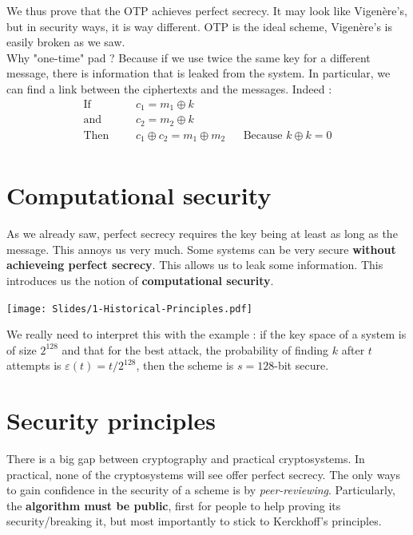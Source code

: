 \documentclass[a4paper, 12pt]{book}
\begin{document}
We thus prove that the OTP achieves perfect secrecy. It may look like Vigenère's, but in security ways, it is way different. OTP is the ideal scheme, Vigenère's is easily broken as we saw. \\

Why "one-time" pad ? Because if we use twice the same key for a different message, there is information that is leaked from the system. In particular, we can find a link between the ciphertexts and the messages. Indeed :
\begin{align*}
    \text{If} &&& c_1 = m_1 \oplus k \\
    \text{and} &&& c_2 = m_2 \oplus k \\
    \text{Then} &&& c_1 \oplus c_2 = m_1\oplus m_2 && \text{Because $k\oplus k = 0$} \\
\end{align*}

\section{Computational security}
As we already saw, perfect secrecy requires the key being at least as long as the message. This annoys us very much. Some systems can be very secure \textbf{without achieveing perfect secrecy}. This allows us to leak some information. This introduces us the notion of \textbf{computational security}. \\


\begin{center}
    \texttt{[image: Slides/1-Historical-Principles.pdf]}
\end{center}

We really need to interpret this with the example : if the key space of a system is of size $2^{128}$ and that for the best attack, the probability of finding $k$ after $t$ attempts is $\varepsilon(t) = t/2^{128}$, then the scheme is $s=128$-bit secure. 

\section{Security principles}
There is a big gap between cryptography and practical cryptosystems. In practical, none of the cryptosystems will see offer perfect secrecy. The only ways to gain confidence in the security of a scheme is by \textit{peer-reviewing}. Particularly, the \textbf{algorithm must be public}, first for people to help proving its security/breaking it, but most importantly to stick to Kerckhoff's principles.
\end{document}
